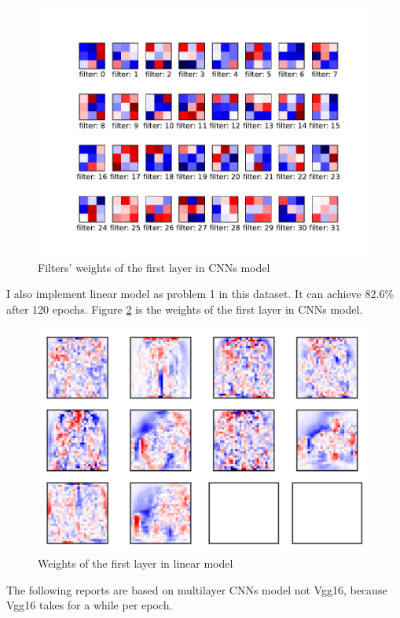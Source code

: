 \documentclass{article}
\begin{document}
\begin{figure}[!h]
  \centering
  \includegraphics[scale=0.5]{imgs/weight.pdf}
  \caption{Filters' weights of the first layer in CNNs model}
  \label{filt}
\end{figure}

I also implement linear model as problem 1 in this dataset. It can achieve 82.6\% after 120 epochs. Figure \ref{weight} is the weights of the first layer in CNNs model.

\begin{figure}[!h]
  \centering
  \includegraphics[scale=1.]{imgs/weights.pdf}
  \caption{Weights of the first layer in linear model}
  \label{weight}
\end{figure}

The following reports are based on multilayer CNNs model not Vgg16, because Vgg16 takes for a while per epoch.
\end{document}
